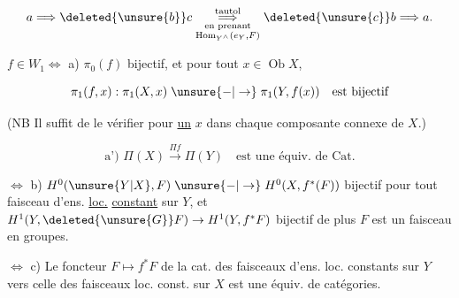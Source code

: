 \[
 a\Longrightarrow \deleted{\unsure{b}}c
\underset{\substack{\text{en prenant}\\\operatorname{Hom}_{Y^\wedge}(e_Y,F)}}{\overset{\text{tautol}}{\Longrightarrow}}
\deleted{\unsure{c}}b\Longrightarrow a.
\]

$f\in W_1\Longleftrightarrow$ a) $\pi_0(f)$ bijectif, et pour tout $x\in\operatorname{Ob}X$,

\[
 \pi_1(f,x):\pi_1(X,x)\mathrel{\unsure{-|\to}}\pi_1(Y,f(x))\quad\text{est bijectif}
\]

(NB Il suffit de le vérifier pour \uline{un} $x$ dans chaque composante connexe de $X$.)

\[
 \text{a') }\Pi(X)\xrightarrow{\Pi f}\Pi(Y)\quad\text{est une équiv. de Cat.}
\]

$\Longleftrightarrow$ b) $H^0(\unsure{Y|X},F)\mathrel{\unsure{-|\to}}H^0(X,f^*(F))$ bijectif pour tout faisceau d'ens. \uline{loc.} \uline{constant} sur $Y$, et $H^1(Y,\deleted{\unsure{G}}F)\to H^1(Y,f^*F)$ bijectif   de plus $F$ est un faisceau en groupes.


$\Longleftrightarrow$ c) Le foncteur $F\mapsto f^*F$ de la cat. des faisceaux d'ens. loc. constants sur $Y$ vers celle des faisceaux loc. const. sur $X$ est une équiv. de catégories.
